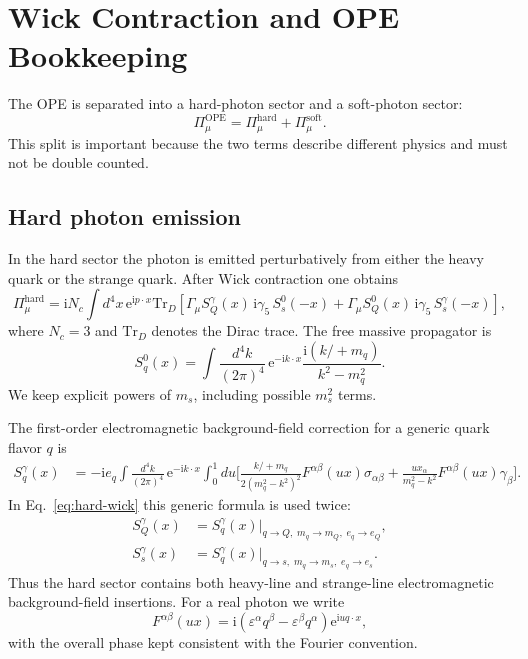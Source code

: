 \documentclass[11pt]{article}
\newcommand{\ii}{\mathrm{i}}
\newcommand{\ee}{\mathrm{e}}
\newcommand{\Tr}{\mathrm{Tr}}
\newcommand{\slashp}[1]{#1\!\!\!/}
\begin{document}
\section{Wick Contraction and OPE Bookkeeping}

The OPE is separated into a hard-photon sector and a soft-photon sector:
\begin{equation}
  \Pi_\mu^{\mathrm{OPE}}
  =
  \Pi_\mu^{\mathrm{hard}}
  +
  \Pi_\mu^{\mathrm{soft}}.
\end{equation}
This split is important because the two terms describe different physics and
must not be double counted.

\subsection{Hard photon emission}

In the hard sector the photon is emitted perturbatively from either the heavy
quark or the strange quark.  After Wick contraction one obtains
\begin{equation}
  \Pi_\mu^{\mathrm{hard}}
  =
  \ii N_c\int d^4x\,\ee^{\ii p\cdot x}
  \Tr_D\!\left[
    \Gamma_\mu S_Q^\gamma(x)\,\ii\gamma_5\,S_s^0(-x)
    +
    \Gamma_\mu S_Q^0(x)\,\ii\gamma_5\,S_s^\gamma(-x)
  \right],
  \label{eq:hard-wick}
\end{equation}
where $N_c=3$ and $\Tr_D$ denotes the Dirac trace.  The free massive propagator is
\begin{equation}
  S_q^0(x)
  =
  \int\frac{d^4k}{(2\pi)^4}\,\ee^{-\ii k\cdot x}
  \frac{\ii(\slashp{k}+m_q)}{k^2-m_q^2}.
\end{equation}
We keep explicit powers of $m_s$, including possible $m_s^2$ terms.

The first-order electromagnetic background-field correction for a generic quark
flavor $q$ is
\begin{align}
  S_q^\gamma(x)
  &=
  -\ii e_q
  \int\frac{d^4k}{(2\pi)^4}\,\ee^{-\ii k\cdot x}
  \int_0^1du
  \Bigg[
    \frac{\slashp{k}+m_q}{2(m_q^2-k^2)^2}
    F^{\alpha\beta}(ux)\sigma_{\alpha\beta}
    +
    \frac{u x_\alpha}{m_q^2-k^2}
    F^{\alpha\beta}(ux)\gamma_\beta
  \Bigg].
  \label{eq:em-propagator}
\end{align}
In Eq.~\eqref{eq:hard-wick} this generic formula is used twice:
\begin{align}
  S_Q^\gamma(x)
  &= S_q^\gamma(x)\big|_{q\to Q,\;m_q\to m_Q,\;e_q\to e_Q},\\
  S_s^\gamma(x)
  &= S_q^\gamma(x)\big|_{q\to s,\;m_q\to m_s,\;e_q\to e_s}.
\end{align}
Thus the hard sector contains both heavy-line and strange-line electromagnetic
background-field insertions.
For a real photon we write
\begin{equation}
  F^{\alpha\beta}(ux)
  =
  \ii(\varepsilon^\alpha q^\beta-\varepsilon^\beta q^\alpha)
  \ee^{\ii u q\cdot x},
\end{equation}
with the overall phase kept consistent with the Fourier convention.
\end{document}
